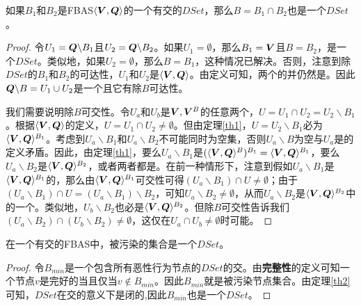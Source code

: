 \begin{theorem}\label{th2}
        如果$B_1$和$B_2$是FBAS$\langle{\bm V},{\bm Q}\rangle$的一个有{\quorum}交的$DSet$，那么$B=B_1\cap B_2$也是一个$DSet$。
\end{theorem}

\begin{proof}
        令$U_1={\bm Q}\backslash B_1$且$U_2={\bm Q}\backslash B_2$。如果$U_1=\emptyset$，那么$B_1={\bm V}$且$B=B_2$，是一个$DSet$。类似地，如果$U_2=\emptyset$，那么$B=B_1$，这种情况已解决。否则，注意到除$DSet$的$B_1$和$B_2$的{\quorum}可达性，$U_1$和$U_2$是$\langle{\bm V},{\bm Q}\rangle$。由定义可知，两个{\quorum}的并仍然是{\quorum}。因此${{\bm Q}\backslash B}=U_1\cup U_2$是一个{\quorum}且它有除$B${\quorum}可达性。
        
        我们需要说明除$B${\quorum}可交性。令$U_a$和$U_b$是${{\bm V},{\bm V}^{B}}$的任意两个{\quorum}，$U=U_1\cap U_2 = U_2\backslash B_1$。根据$\langle{\bm V},{\bm Q}\rangle$的定义，$U=U_1\cap U_2  \neq \emptyset$。但由定理\ref{th1}，$U=U_2\backslash B_1$必为$\langle{\bm V},{\bm Q}\rangle^{B_1}$。考虑到$U_a\backslash B_1$和$U_a\backslash B_2$不可能同时为空集，否则$U_a\backslash B$为空与$U_a$是{\quorum}的定义矛盾。因此，由定理\ref{th1}，要么$U_a\backslash B_1$是$(\langle{\bm V},{\bm Q}\rangle^{B})^{B_1}=\langle{\bm V},{\bm Q}\rangle^{B_1}$，要么$U_a\backslash B_2$是$\langle{\bm V},{\bm Q}\rangle^{B_2}$，或者两者都是。在前一种情形下，注意到假如$U_a\backslash B_1$是$\langle{\bm V},{\bm Q}\rangle^{B_1}$的{\quorum}，那么由$\langle{\bm V},{\bm Q}\rangle^{B_1}${\quorum}可交性可得$(U_a\backslash B_1)\cap U\neq \emptyset$；由于$(U_a\backslash B_1)\cap U = (U_a\backslash B_1)\backslash B_2$，可知$U_a\backslash B_2\neq \emptyset$，从而$U_a\backslash B_2$是$\langle{\bm V},{\bm Q}\rangle^{B_2}$中的一个{\quorum}。类似地，$U_b\backslash B_2$也必是$\langle{\bm V},{\bm Q}\rangle^{B_2}$。但除$B${\quorum}可交性告诉我们$(U_a\backslash B_2)\cap (U_b\backslash B_2)\neq \emptyset$，这仅在$U_a\cap U_b\neq \emptyset$时可能。
\end{proof}

\begin{theorem}\label{th3}
        在一个有{\quorum}交的FBAS中，被污染的集合是一个$DSet$。
\end{theorem}

\begin{proof}
        令$B_{min}$是一个包含所有恶性行为节点的$DSet$的交。由\textbf{完整性}的定义可知一个节点$v$是完好的当且仅当$v\not\in B_{min}$。因此$B_{min}$就是被污染节点集合。由定理\ref{th2}可知，$DSet$在交的意义下是闭的,因此$B_{min}$也是一个$DSet$。
\end{proof}
